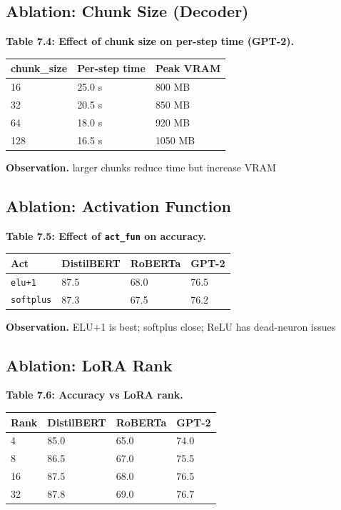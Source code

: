 \subsection{Ablation: Chunk Size (Decoder)}

\textbf{Table 7.4: Effect of chunk size on per-step time (GPT-2).}

\begin{table}[H]
\centering
\small
\begin{tabular}{lll}
\toprule
\textbf{chunk\_size} & \textbf{Per-step time} & \textbf{Peak VRAM} \\
\midrule
16 & 25.0 s & 800 MB \\
32 & 20.5 s & 850 MB \\
64 & 18.0 s & 920 MB \\
128 & 16.5 s & 1050 MB \\
\bottomrule
\end{tabular}
\end{table}

\textbf{Observation.} larger chunks reduce time but increase VRAM

\subsection{Ablation: Activation Function}

\textbf{Table 7.5: Effect of \texttt{act\_fun} on accuracy.}

\begin{table}[H]
\centering
\small
\begin{tabular}{llll}
\toprule
\textbf{Act} & \textbf{DistilBERT} & \textbf{RoBERTa} & \textbf{GPT-2} \\
\midrule
\texttt{elu+1} & 87.5 & 68.0 & 76.5 \\
\texttt{softplus} & 87.3 & 67.5 & 76.2 \\
\bottomrule
\end{tabular}
\end{table}

\textbf{Observation.} ELU+1 is best; softplus close; ReLU has dead-neuron issues

\subsection{Ablation: LoRA Rank}

\textbf{Table 7.6: Accuracy vs LoRA rank.}

\begin{table}[H]
\centering
\small
\begin{tabular}{llll}
\toprule
\textbf{Rank} & \textbf{DistilBERT} & \textbf{RoBERTa} & \textbf{GPT-2} \\
\midrule
4 & 85.0 & 65.0 & 74.0 \\
8 & 86.5 & 67.0 & 75.5 \\
16 & 87.5 & 68.0 & 76.5 \\
32 & 87.8 & 69.0 & 76.7 \\
\bottomrule
\end{tabular}
\end{table}

